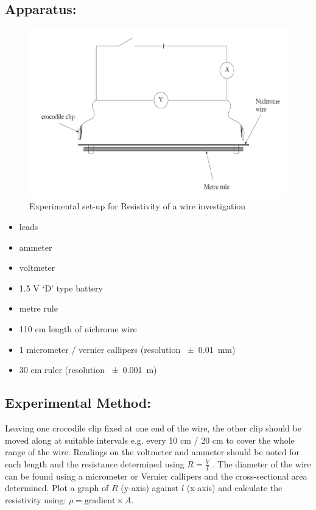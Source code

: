 \documentclass{tufte-handout}
\begin{document}
\subsection{Apparatus:} 
\begin{figure}
\includegraphics[width=\textwidth]{resist.PNG}
\caption{Experimental set-up for Resistivity of a wire investigation}
\end{figure}
\begin{itemize}
\item leads 
\item ammeter 
\item voltmeter 
\item 1.5 V `D' type battery 
\item metre rule 
\item 110 cm length of nichrome wire
\item 1  micrometer / vernier callipers (resolution \SI{\pm 0.01}{mm})  
\item 30 cm ruler (resolution \SI{\pm 0.001}{m})  
\end{itemize}
\subsection{Experimental Method:}  
Leaving one crocodile clip fixed at one end of the wire, the other clip should be moved along at suitable intervals e.g. every 10 cm / 20 cm to cover the whole range of the wire. Readings on the voltmeter and ammeter should be noted for each length and the resistance determined using $R = \frac{V}{I}$ . The diameter of the wire can be found using a micrometer or Vernier callipers and the cross-sectional area determined. Plot a graph of $R$ (y-axis) against $l$ (x-axis) and calculate the resistivity using:  $\rho = \text{gradient} \times A$. 
\end{document}
